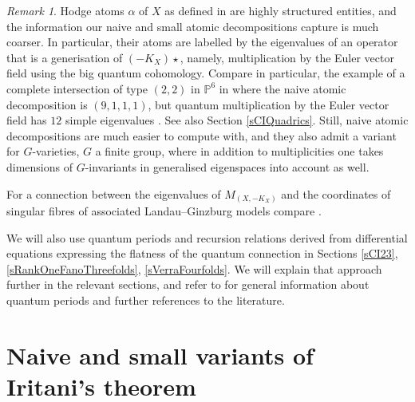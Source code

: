 \documentclass[11pt]{amsart}
\theoremstyle{plain}
\numberwithin{equation}{section}
\theoremstyle{definition}
\theoremstyle{remark}
\newtheorem{remark}[theorem]{Remark}
\begin{document}
\begin{remark}\label{rNaive}
Hodge atoms $\alpha$ of $X$ as defined in \cite{KKPY25} are highly structured entities, and the information our naive and small atomic decompositions capture is much coarser. In particular, their atoms are labelled by the eigenvalues of an operator that is a generisation of $(-K_X)\star$, namely, multiplication by the Euler vector field using the big quantum cohomology. Compare in particular, the example of a complete intersection of type $(2,2)$ in $\mathbb{P}^6$ in \cite[Example 2.13, p. 28]{CKK25} where the naive atomic decomposition is $(9,1,1,1)$, but quantum multiplication by the Euler vector field has $12$ simple eigenvalues \cite{Hu21}. See also Section \ref{sCIQuadrics}. Still, naive atomic decompositions are much easier to compute with, and they also admit a variant for $G$-varieties, $G$ a finite group, where in addition to multiplicities one takes dimensions of $G$-invariants in generalised eigenspaces into account as well. 
\end{remark}

For a connection between the  eigenvalues of $M_{(X, -K_X)}$ and the coordinates of
singular fibres of associated Landau--Ginzburg models compare \cite{Pr18, Pr26}.


We will also use quantum periods and recursion relations derived from differential equations expressing the flatness of the quantum connection in Sections \ref{sCI23}, \ref{sRankOneFanoThreefolds}, \ref{sVerraFourfolds}. We will  explain that approach further in the relevant sections, and refer to \cite{CCGGK14} for general information about quantum periods and further references to the literature.

\section{Naive and small variants of Iritani's theorem}\label{sIritani}
\end{document}
